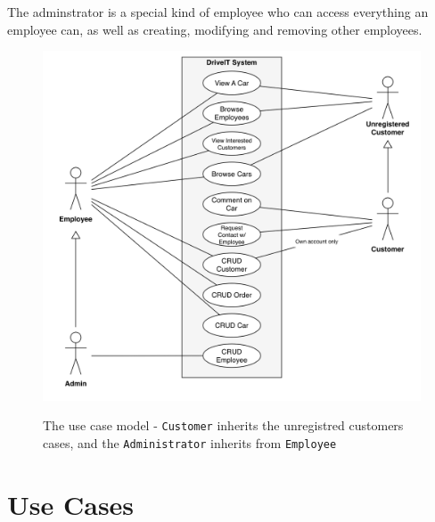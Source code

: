 The adminstrator is a special kind of employee who can access everything an employee can, as well as creating, modifying and removing other employees.\\

\begin{figure}[h!]
    \centering
        \includegraphics[scale=0.4]{Figures/UseCase-Model}\\
    \caption{The use case model - \texttt{Customer} inherits the unregistred customers cases, and the \texttt{Administrator} inherits from \texttt{Employee}}
  \label{fig:UseCaseModel}
\end{figure}

\newpage
\section{Use Cases}










